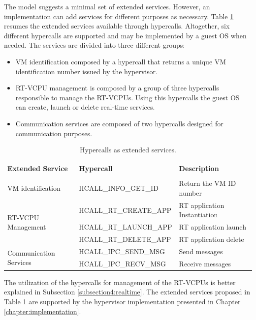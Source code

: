 The model suggests a minimal set of extended services. However, an implementation can add services for different purposes as necessary. Table \ref{table:hypercalls} resumes the extended services available through hypercalls. Altogether, six different hypercalls are supported and may be implemented by a guest OS when needed. The services are divided into three different groups:

\begin{itemize}
    \item VM identification composed by a hypercall that returns a unique VM identification number issued by the hypervisor.
    \item RT-VCPU management is composed by a group of three hypercalls responsible to manage the RT-VCPUs. Using this hypercalls the guest OS can create, launch or delete  real-time services.  
    \item Communication services are composed of two hypercalls designed for communication purposes.
\end{itemize}


\begin{table}[!hbtp]
\caption{Hypercalls as extended services.}
\centering
\begin{tabular}{l l l}
\hline\hline \\
\textbf{Extended Service} & \textbf{Hypercall} & \textbf{Description} \\ 
\hline \\
VM identification & HCALL\_INFO\_GET\_ID  & Return the VM ID number  \\
\hline
\multirow{3}{*}{RT-VCPU  Management} & 
    HCALL\_RT\_CREATE\_APP & RT application Instantiation  \\
    & HCALL\_RT\_LAUNCH\_APP & RT application launch  \\
    & HCALL\_RT\_DELETE\_APP & RT application delete \\
    \hline
\multirow{2}{*}{Communication Services} & 
     HCALL\_IPC\_SEND\_MSG  & Send messages \\ 
    & HCALL\_IPC\_RECV\_MSG & Receive messages \\ \hline
\end{tabular}
\label{table:hypercalls} 
\end{table}

The utilization of the hypercalls for management  of the RT-VCPUs is better explained in Subsection \ref{subsection4:realtime}. The extended services proposed in Table \ref{table:hypercalls} are supported by the hypervisor implementation presented in Chapter \ref{chapter:implementation}.

